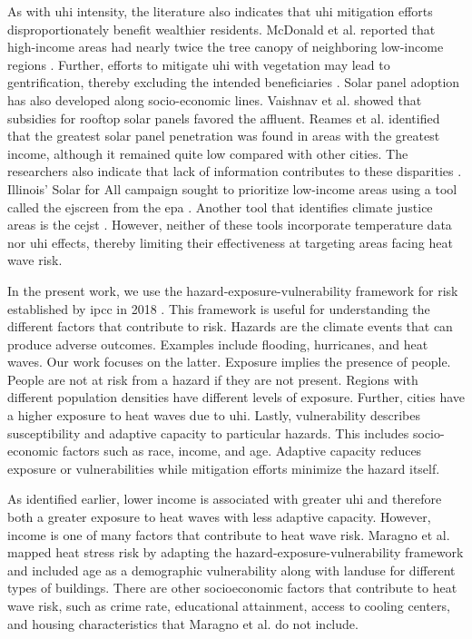 As with \ac{uhi} intensity, the literature also indicates that \ac{uhi} mitigation
efforts disproportionately benefit wealthier residents. McDonald et al. reported
that high-income areas had nearly twice the tree canopy of neighboring low-income
regions \cite{mcdonald_tree_2021}. Further, efforts to mitigate \ac{uhi} with
vegetation may lead to gentrification, thereby excluding the intended beneficiaries
\cite{chakraborty_disproportionately_2019}. Solar panel adoption has also developed
along socio-economic lines. Vaishnav et al. \cite{vaishnav_was_2017} showed that
subsidies for rooftop solar panels favored the affluent. Reames et al.
\cite{reames_distributional_2020} identified that the greatest solar panel
penetration was found in areas with the greatest income, although it remained
quite low compared with other cities. The researchers also indicate that lack
of information contributes to these disparities \cite{vaishnav_was_2017,reames_distributional_2020}.
Illinois' Solar for All campaign sought to prioritize low-income areas using a
tool called the \ac{ejscreen} from the \ac{epa} \cite{us_epa_ejscreen_2014}. Another
tool that identifies climate justice areas is the \ac{cejst}
\cite{council_on_environmental_quality_climate_nodate}. However, neither of these
tools incorporate temperature data nor \ac{uhi} effects, thereby limiting their
effectiveness at targeting areas facing heat wave risk.

In the present work, we use the hazard-exposure-vulnerability framework for
risk established by \ac{ipcc} in 2018 \cite{viner_understanding_2020}. This
framework is useful for understanding the different factors that contribute to
risk. Hazards are the climate events that can produce adverse outcomes. Examples
include flooding, hurricanes, and heat waves. Our work focuses on the latter.
Exposure implies the presence of people. People are not at risk from a hazard if
they are not present. Regions with different population densities have different
levels of exposure. Further, cities have a higher exposure to heat waves due to
\ac{uhi}. Lastly, vulnerability describes susceptibility and adaptive capacity to
particular hazards. This includes socio-economic factors such as race, income,
and age. Adaptive capacity reduces exposure or vulnerabilities while mitigation
efforts minimize the hazard itself.

As identified earlier, lower income is associated with greater \ac{uhi} and therefore
both a greater exposure to heat waves with less adaptive capacity. However, income
is one of many factors that contribute to heat wave risk. Maragno et al.
\cite{maragno_mapping_2020} mapped heat stress risk by adapting the
hazard-exposure-vulnerability framework and included age as a demographic vulnerability
along with landuse for different types of buildings. There are other
socioeconomic factors that contribute to heat wave risk, such as crime rate,
educational attainment, access to cooling centers, and housing characteristics
\cite{klinenberg_heat_2003,gronlund_racial_2014} that Maragno et al. do not include.

